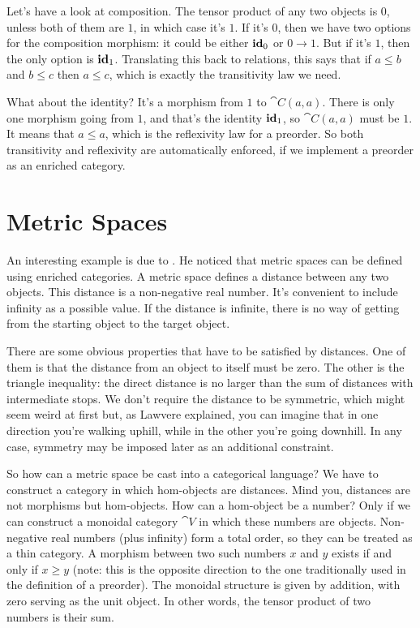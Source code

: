 Let's have a look at composition. The tensor product of any two objects
is $0$, unless both of them are $1$, in which case it's $1$. If it's $0$, then
we have two options for the composition morphism: it could be either
$\idarrow[0]$ or $0 \to 1$. But if it's $1$, then the only
option is $\idarrow[1]$. Translating this back to relations, this says
that if $a \leqslant b$ and $b \leqslant c$ then
$a \leqslant c$, which is exactly the transitivity law we
need.

What about the identity? It's a morphism from $1$ to $\cat{C}(a, a)$.
There is only one morphism going from $1$, and that's the identity
$\idarrow[1]$, so $\cat{C}(a, a)$ must be $1$. It means that
$a \leqslant a$, which is the reflexivity law for a
preorder. So both transitivity and reflexivity are automatically
enforced, if we implement a preorder as an enriched category.

\section{Metric Spaces}

An interesting example is due to
. He noticed that metric spaces can be defined using enriched
categories. A metric space defines a distance between any two objects.
This distance is a non-negative real number. It's convenient to include
infinity as a possible value. If the distance is infinite, there is no
way of getting from the starting object to the target object.

There are some obvious properties that have to be satisfied by
distances. One of them is that the distance from an object to itself
must be zero. The other is the triangle inequality: the direct distance
is no larger than the sum of distances with intermediate stops. We don't
require the distance to be symmetric, which might seem weird at first
but, as Lawvere explained, you can imagine that in one direction you're
walking uphill, while in the other you're going downhill. In any case,
symmetry may be imposed later as an additional constraint.

So how can a metric space be cast into a categorical language? We have
to construct a category in which hom-objects are distances. Mind you,
distances are not morphisms but hom-objects. How can a hom-object be a
number? Only if we can construct a monoidal category $\cat{V}$ in which
these numbers are objects. Non-negative real numbers (plus infinity)
form a total order, so they can be treated as a thin category. A
morphism between two such numbers $x$ and $y$ exists if
and only if $x \geqslant y$ (note: this is the opposite
direction to the one traditionally used in the definition of a
preorder). The monoidal structure is given by addition, with zero
serving as the unit object. In other words, the tensor product of two
numbers is their sum.

